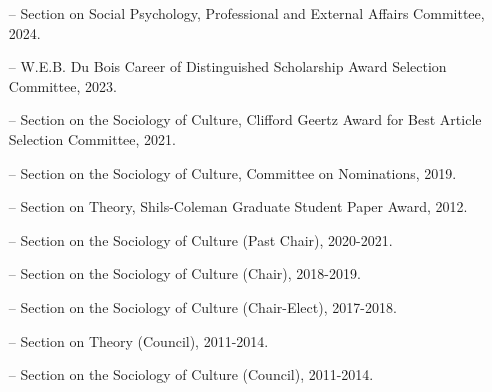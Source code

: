 \begin{itemize}[itemsep=-0.5ex]
    \item[--] Section on Social Psychology, Professional and External Affairs Committee, 2024.
    \item[--] W.E.B. Du Bois Career of Distinguished Scholarship Award Selection Committee, 2023.
    \item[--] Section on the Sociology of Culture, Clifford Geertz Award for Best Article Selection Committee, 2021.
    \item[--] Section on the Sociology of Culture, Committee on Nominations, 2019.
    \item[--] Section on Theory, Shils-Coleman Graduate Student Paper Award, 2012.
\end{itemize}

\begin{itemize}[itemsep=-0.5ex]
    \item[--] Section on the Sociology of Culture (Past Chair), 2020-2021.
    \item[--] Section on the Sociology of Culture (Chair), 2018-2019.
    \item[--] Section on the Sociology of Culture (Chair-Elect), 2017-2018.
    \item[--] Section on Theory (Council), 2011-2014.
    \item[--] Section on the Sociology of Culture (Council), 2011-2014.
\end{itemize}
